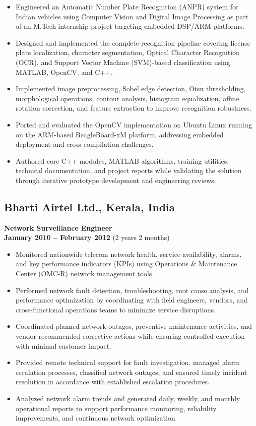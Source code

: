\documentclass[a4paper,10pt]{article}
\begin{document}
\begin{itemize}
\item Engineered an Automatic Number Plate Recognition (ANPR) system for Indian vehicles using Computer Vision and Digital Image Processing as part of an M.Tech internship project targeting embedded DSP/ARM platforms.
\item Designed and implemented the complete recognition pipeline covering license plate localization, character segmentation, Optical Character Recognition (OCR), and Support Vector Machine (SVM)-based classification using MATLAB, OpenCV, and C++.
\item Implemented image preprocessing, Sobel edge detection, Otsu thresholding, morphological operations, contour analysis, histogram equalization, affine rotation correction, and feature extraction to improve recognition robustness.
\item Ported and evaluated the OpenCV implementation on Ubuntu Linux running on the ARM-based BeagleBoard-xM platform, addressing embedded deployment and cross-compilation challenges.
\item Authored core C++ modules, MATLAB algorithms, training utilities, technical documentation, and project reports while validating the solution through iterative prototype development and engineering reviews.
\end{itemize}


\subsection{Bharti Airtel Ltd., Kerala, India}
\textbf{Network Surveillance Engineer} \\
\hfill \textbf{January 2010 -- February 2012}  (2 years 2 months)

\begin{itemize}
\item Monitored nationwide telecom network health, service availability, alarms, and key performance indicators (KPIs) using Operations \& Maintenance Center (OMC-R) network management tools.
\item Performed network fault detection, troubleshooting, root cause analysis, and performance optimization by coordinating with field engineers, vendors, and cross-functional operations teams to minimize service disruptions.
\item Coordinated planned network outages, preventive maintenance activities, and vendor-recommended corrective actions while ensuring controlled execution with minimal customer impact.
\item Provided remote technical support for fault investigation, managed alarm escalation processes, classified network outages, and ensured timely incident resolution in accordance with established escalation procedures.
\item Analyzed network alarm trends and generated daily, weekly, and monthly operational reports to support performance monitoring, reliability improvements, and continuous network optimization.
\end{itemize}
\end{document}
